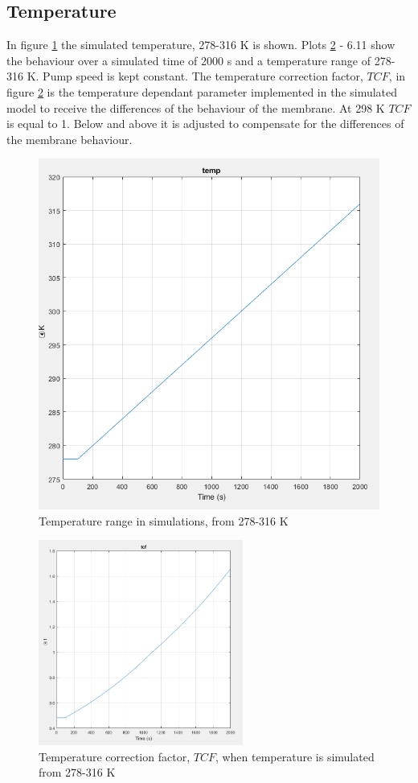\subsection{Temperature}
In figure \ref{fig:temp} the simulated temperature, 278-316 K is shown. Plots \ref{fig:tcf} - 6.11 show the behaviour over a simulated time of 2000 s and a temperature range of 278-316 K. Pump speed is kept constant. The temperature correction factor, $TCF$, in figure \ref{fig:tcf} is the temperature dependant parameter implemented in the simulated model to receive the differences of the behaviour of the membrane. At 298 K $TCF$ is equal to 1. Below and above it is adjusted to compensate for the differences of the membrane behaviour. 
\begin{figure}[h]
  \centering
  \includegraphics[width=0.6\linewidth]{temp.PNG}
  \caption{Temperature range in simulations, from 278-316 K}
  \label{fig:temp}
\end{figure}

\begin{figure}[h]
\centering
    \centering
    \includegraphics[width=0.6\textwidth]{tcf.PNG}
    \caption{Temperature correction factor, $TCF$, when temperature is simulated from 278-316 K}
    \label{fig:tcf}
\end{figure}
\newpage

